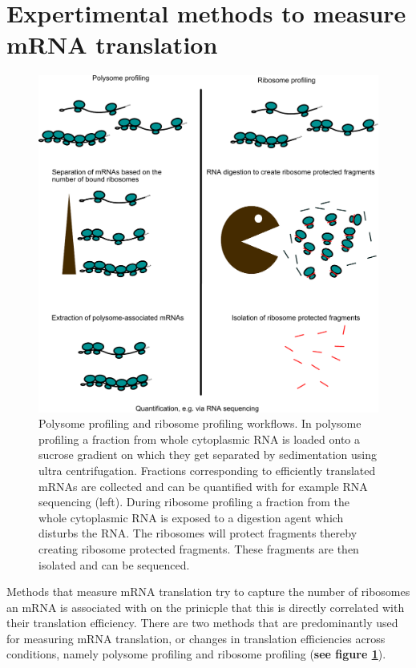 \documentclass[12pt,openany]{book}
\begin{document}
\section{Expertimental methods to measure mRNA translation} \label{exptMethod}\begin{figure}
    \includegraphics{./figures/polyRibo.pdf}
  \caption{Polysome profiling and ribosome profiling workflows. In polysome profiling a fraction from whole cytoplasmic RNA is loaded onto a sucrose gradient on which they get separated by sedimentation using ultra centrifugation. Fractions corresponding to efficiently translated mRNAs are collected and can be quantified with for example RNA sequencing (left). During ribosome profiling a fraction from the whole cytoplasmic RNA is exposed to a digestion agent which disturbs the RNA. The ribosomes will protect fragments thereby creating ribosome protected fragments. These fragments are then isolated and can be sequenced.  \label{fig:polyRibo}}
\end{figure}

Methods that measure mRNA translation try to capture the number of
ribosomes an mRNA is associated with on the prinicple that this is
directly correlated with their translation efficiency. There are two
methods that are predominantly used for measuring mRNA translation, or
changes in translation efficiencies across conditions, namely polysome
profiling and ribosome profiling (\textbf{see figure
\ref{fig:polyRibo}}).
\end{document}
